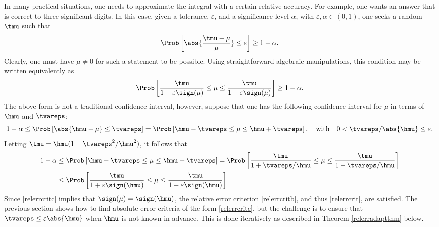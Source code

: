 \documentclass[graybox]{svmult}
\begin{document}
In many practical situations, one needs to approximate the integral with a certain relative accuracy.  For example, one wants an answer that is correct to three significant digits.  In this case, given a tolerance, $\varepsilon$, and a significance level $\alpha$, with $\varepsilon, \alpha \in (0, 1)$, one seeks a random $\tmu$ such that 
\begin{equation} \label{relerrcrit}
\Prob\left[\abs{\frac{\tmu-\mu}{\mu}} \le \varepsilon \right] \geq 1-\alpha.
\end{equation}
Clearly, one must have $\mu\ne0$ for such a statement to be possible.  Using straightforward algebraic manipulations, this condition may be written equivalently as 
\begin{equation} \label{relerrcritb}
\Prob\left[\frac{\tmu}{1 + \varepsilon \sign(\mu)} \le \mu \le \frac{\tmu}{1 - \varepsilon \sign(\mu)} \right] \geq 1-\alpha.
\end{equation}
The above form is not a traditional confidence interval, however, suppose that one has the following confidence interval for $\mu$ in terms of $\hmu$ and $\tvareps$: 
\begin{equation} \label{relerrcritc}
1-\alpha \le \Prob\left[\abs{\hmu-\mu} \le \tvareps \right] = \Prob\left[\hmu -\tvareps \le \mu \le \hmu + \tvareps \right], \quad \text{with} \quad 0 < \tvareps/\abs{\hmu} \le \varepsilon.
\end{equation}
Letting $\tmu = \hmu(1 - \tvareps^2/\hmu^2)$, it follows that 
\begin{align*} 
1-\alpha &\le \Prob\left[\hmu -\tvareps \le \mu \le \hmu + \tvareps \right] =\Prob\left[\frac{\tmu}{1+\tvareps/\hmu} \le \mu \le \frac{\tmu}{1-\tvareps/\hmu} \right] \\
&\le\Prob\left[\frac{\tmu}{1+\varepsilon\sign(\hmu)} \le \mu \le \frac{\tmu}{1-\varepsilon\sign(\hmu)} \right]
\end{align*}
Since \eqref{relerrcritc} implies that $\sign(\mu) = \sign(\hmu)$, the relative error criterion \eqref{relerrcritb}, and thus \eqref{relerrcrit}, are satisfied.  The previous section shows how to find absolute error criteria of the form \eqref{relerrcritc}, but the challenge is to ensure that $\tvareps \le \varepsilon\abs{\hmu}$ when $\hmu$ is not known in advance.  This is done iteratively as described in Theorem \ref{relerradaptthm} below.
\end{document}
